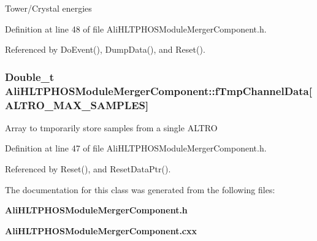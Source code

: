 Tower/Crystal energies 

Definition at line 48 of file Ali\-HLTPHOSModule\-Merger\-Component.h.

Referenced by Do\-Event(), Dump\-Data(), and Reset().
\subsubsection{\setlength{\rightskip}{0pt plus 5cm}Double\_\-t {\bf Ali\-HLTPHOSModule\-Merger\-Component::f\-Tmp\-Channel\-Data}[ALTRO\_\-MAX\_\-SAMPLES]\hspace{0.3cm}{\tt  [private]}}\label{classAliHLTPHOSModuleMergerComponent_r2}


Array to tmporarily store samples from a single ALTRO 

Definition at line 47 of file Ali\-HLTPHOSModule\-Merger\-Component.h.

Referenced by Reset(), and Reset\-Data\-Ptr().

The documentation for this class was generated from the following files:\begin{CompactItemize}
\item 
{\bf Ali\-HLTPHOSModule\-Merger\-Component.h}\item 
{\bf Ali\-HLTPHOSModule\-Merger\-Component.cxx}\end{CompactItemize}
